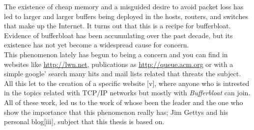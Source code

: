 The existence of cheap memory and a misguided desire to avoid packet loss has led to larger and larger buffers being deployed in the hosts, routers, and switches that make up the Internet. It turns out that this is a recipe for bufferbloat. Evidence of bufferbloat has been accumulating over the past decade, but its existence has not yet become a widespread cause for concern.\\

This phenomenon lately has begun to being a concern and you can find in websites like \url{http://lwn.net}, publications as \url{http://queue.acm.org} or with a simple google' search many hits and mail lists related that threats the subject. All this let to the creation of a specific website [v], where anyone who is intrested in the topics related with TCP/IP networks but mostly with \textit{Bufferbloat} can join. All of these work, led us to the work of whose been the leader and the one who show the importance that this phenomenon really has; Jim Gettys and his personal blog[iii], subject that this thesis is based on.
